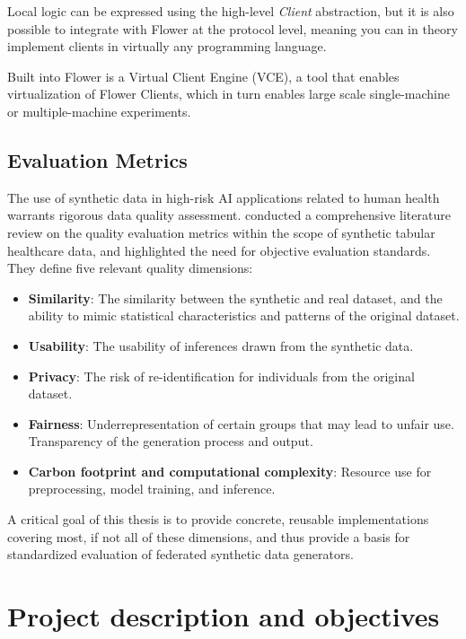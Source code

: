 \documentclass{article}
\begin{document}
Local logic can be expressed using the high-level \textit{Client}
abstraction, but it is also possible to integrate with Flower at the
protocol level, meaning you can in theory implement clients in
virtually any programming language.
\parencite{flower_article}

Built into Flower is a Virtual Client Engine (VCE), a tool that
enables virtualization of Flower Clients, which in turn enables
large scale single-machine or multiple-machine experiments.
\parencite{flower_article}

\subsection{Evaluation Metrics}
The use of synthetic data in high-risk AI applications related to
human health warrants rigorous data quality assessment. \cite{metrics}
conducted a comprehensive literature review on the quality evaluation
metrics within the scope of synthetic tabular healthcare data, and
highlighted the need for objective evaluation standards.
They define five relevant quality dimensions:
\begin{itemize}[label=--]
  \item \textbf{Similarity}: The similarity between the synthetic and
    real dataset, and the ability to mimic statistical characteristics and
    patterns of the original dataset.
  \item \textbf{Usability}: The usability of inferences drawn from
    the synthetic data.
  \item \textbf{Privacy}: The risk of re-identification for individuals
    from the original dataset.
  \item \textbf{Fairness}: Underrepresentation of certain groups that
    may lead to unfair use. Transparency of the generation process and output.
  \item \textbf{Carbon footprint and computational complexity}: Resource
    use for preprocessing, model training, and inference.
\end{itemize}

A critical goal of this thesis is to provide concrete, reusable implementations
covering most, if not all of these dimensions, and thus provide a basis for
standardized evaluation of federated synthetic data generators.

\section{Project description and objectives}
\end{document}
